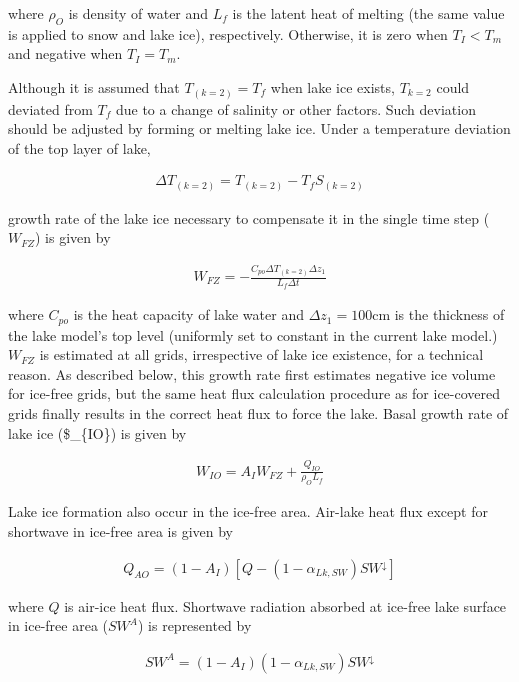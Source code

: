 where \(\rho_O\) is density of water and \(L_f\) is the latent heat of melting (the same value is applied to snow and lake ice), respectively. Otherwise, it is zero when \(T_I < T_m\) and negative
when \(T_I = T_m\).

Although it is assumed that \(T_{(k=2)} = T_f\) when lake ice exists, \(T_{k=2}\) could deviated from \(T_f\) due to a change of salinity or other factors. Such deviation should be adjusted by forming
or melting lake ice. Under a temperature deviation of the top layer of lake,

\begin{eqnarray}
    \Delta T_{(k=2)} = T_{(k=2)} - T_f S_{(k=2)}
\end{eqnarray}

growth rate of the lake ice necessary to compensate it in the single time step (\(W_{FZ}\)) is given by

\begin{eqnarray}
    W_{FZ} = - \frac{C_{po} \Delta T_{(k=2)} \Delta z_1}{L_f \Delta t}
\end{eqnarray}

where \(C_{po}\) is the heat capacity of lake water and \(\Delta z_1=100 \mathrm{cm}\) is the thickness of the lake model's top level (uniformly set to constant in the current lake model.) \(W_{FZ}\)
is estimated at all grids, irrespective of lake ice existence, for a technical reason. As described below, this growth rate first estimates negative ice volume for ice-free grids, but the same heat
flux calculation procedure as for ice-covered grids finally results in the correct heat flux to force the lake. Basal growth rate of lake ice (\$\_\{IO\}) is given by

\begin{eqnarray}
    W_{IO} = A_I W_{FZ} + \frac{Q_{IO}}{\rho_OL_f}
\end{eqnarray}

Lake ice formation also occur in the ice-free area. Air-lake heat flux except for shortwave in ice-free area is given by

\begin{eqnarray}
    Q_{AO} = (1-A_{I}) [Q-(1-\alpha_{Lk,SW})SW^\downarrow]
\end{eqnarray}

where \(Q\) is air-ice heat flux. Shortwave radiation absorbed at ice-free lake surface in ice-free area (\(SW^A\)) is represented by

\begin{eqnarray}
    SW^A = (1-A_I)(1-\alpha_{Lk,SW}) SW^\downarrow
\end{eqnarray}

